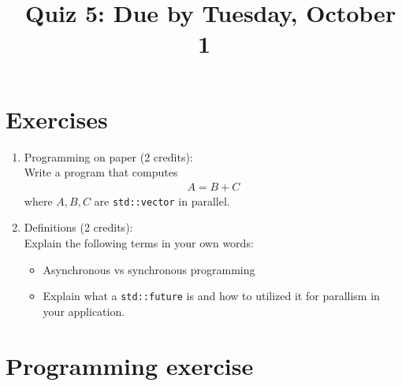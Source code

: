 \documentclass[11pt]{article}
\begin{document}
\title{\coursename~Quiz 5: Due by Tuesday, October 1}
\date{}
\maketitle

\medskip


\section*{Exercises}

\begin{enumerate}
\item Programming on paper (2 credits): \\
Write a program that computes
\begin{align*}
A = B + C
\end{align*}
where $A,B,C$ are \lstinline|std::vector| in parallel.

\item Definitions (2 credits): \\
Explain the following terms in your own words:
\begin{itemize}
\item Asynchronous vs synchronous programming
\item Explain what a \lstinline|std::future| is and how to utilized it for parallism in your application.
\end{itemize}


\end{enumerate}

\section*{Programming exercise}
\end{document}
